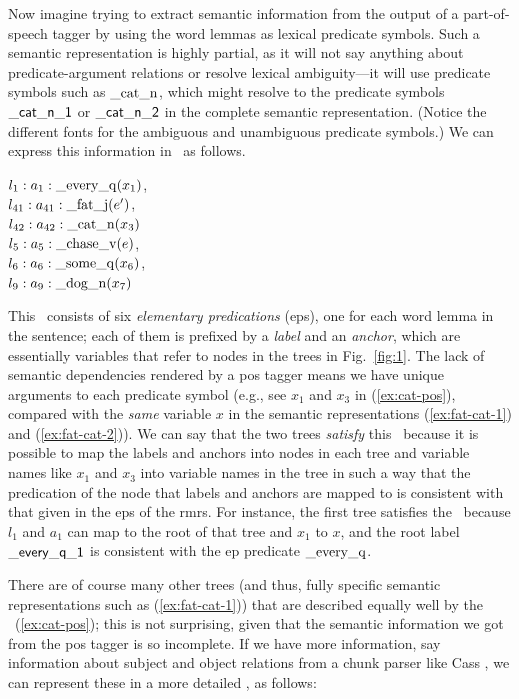 Now imagine trying to extract semantic information from
the output of a part-of-speech tagger by using the word lemmas as
lexical predicate symbols.  Such a semantic representation is highly
partial, as it will not say anything about predicate-argument
relations or resolve lexical ambiguity---it will use predicate
symbols such as $\mathrm{\_cat\_n}$, which might resolve to the
predicate symbols $\mathsf{\_cat\_n\_1}$ or $\mathsf{\_cat\_n\_2}$ in the
complete semantic representation.  (Notice the different
fonts for the ambiguous and unambiguous predicate symbols.)  
We can
express this information in \rmrs\ as follows.

\begin{examples}
\item \label{ex:cat-pos}
$l_1:a_1:\mathrm{\_every\_q}(x_1)$, \\
$l_{41}:a_{41}:\mathrm{\_fat\_j}(e')$,\\
$l_{42}:a_{42}:\mathrm{\_cat\_n}(x_3)$\\
$l_5:a_5:\mathrm{\_chase\_v}(e)$, \\
$l_6:a_6:\mathrm{\_some\_q}(x_6)$, \\
$l_9:a_9:\mathrm{\_dog\_n}(x_7)$
\end{examples}

This \rmrs\ consists of six \emph{elementary predications} ({\sc ep}s), one
for each word lemma in the sentence; each of them is prefixed by a
\emph{label} and an \emph{anchor}, which are essentially variables
that refer to nodes in the trees in Fig.~\ref{fig:1}.  
The lack of semantic dependencies rendered by a {\sc pos} tagger
means we have unique arguments to each
predicate symbol (e.g., see $x_1$ and $x_3$ in (\ref{ex:cat-pos}),
compared with the {\em same} variable $x$ in the semantic
representations (\ref{ex:fat-cat-1}) and (\ref{ex:fat-cat-2})).
We can say that
the two trees \emph{satisfy} this \rmrs\ because it is possible to map
the labels and anchors into nodes in each tree and variable names like
$x_1$ and $x_3$ into variable names in the tree in such a way that the
predication
of
the node that labels and anchors are mapped to is consistent with
that given in the {\sc ep}s of the {\sc rmrs}.
For instance, the first tree satisfies
the \rmrs\ because $l_1$ and $a_1$ can map to the root of that
tree and $x_1$ to $x$, and the root label
$\mathsf{\_every\_q\_1}$ is consistent with the 
{\sc ep} predicate $\mathrm{\_every\_q}$.

There are of course many other trees (and thus, fully specific
semantic representations such as (\ref{ex:fat-cat-1})) that are
described equally well by the \rmrs\ (\ref{ex:cat-pos}); this is
not surprising, 
given that the semantic information we got from the {\sc pos} tagger is so
incomplete.  If we have more information, say information about
subject and object relations from a chunk parser like Cass
\cite{abney:1996}, we can represent these in a more
detailed \rmrs, as follows:


